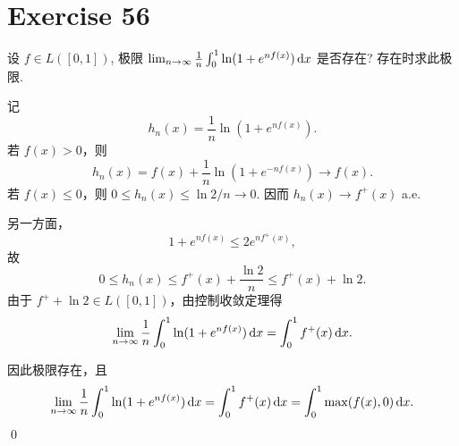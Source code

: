 \documentclass{article}
\begin{document}
\section{Exercise 56}

设 $f \in L([0, 1])$, 极限 $\lim_{n \to \infty} \frac{1}{n} \int_0^1 \ln(1 + e^{nf(x)})\,\mathrm{d} x$ 是否存在? 存在时求此极限.

\begin{solution}
  记
  \[
    h_n(x) = \frac{1}{n}\ln(1+e^{nf(x)}).
  \]
  若 $f(x)>0$，则
  \[
    h_n(x)=f(x)+\frac1n\ln(1+e^{-nf(x)})\to f(x).
  \]
  若 $f(x)\le 0$，则 $0\le h_n(x)\le \ln 2/n \to 0$. 因而 $h_n(x)\to f^+(x)$ a.e.

  另一方面，
  \[
    1+e^{nf(x)} \le 2e^{n f^+(x)},
  \]
  故
  \[
    0\le h_n(x)\le f^+(x)+\frac{\ln 2}{n}\le f^+(x)+\ln 2.
  \]
  由于 $f^+ + \ln 2 \in L([0,1])$，由控制收敛定理得
  \[
    \lim_{n\to\infty} \frac{1}{n}\int_0^1 \ln(1+e^{nf(x)})\,\mathrm{d} x
    = \int_0^1 f^+(x)\,\mathrm{d} x.
  \]

  因此极限存在，且
  \[
    \lim_{n \to \infty} \frac{1}{n} \int_0^1 \ln(1 + e^{nf(x)})\,\mathrm{d} x = \int_0^1 f^+(x)\,\mathrm{d} x = \int_0^1 \max(f(x), 0)\,\mathrm{d} x.
  \]
  \qed
\end{solution}
\end{document}
